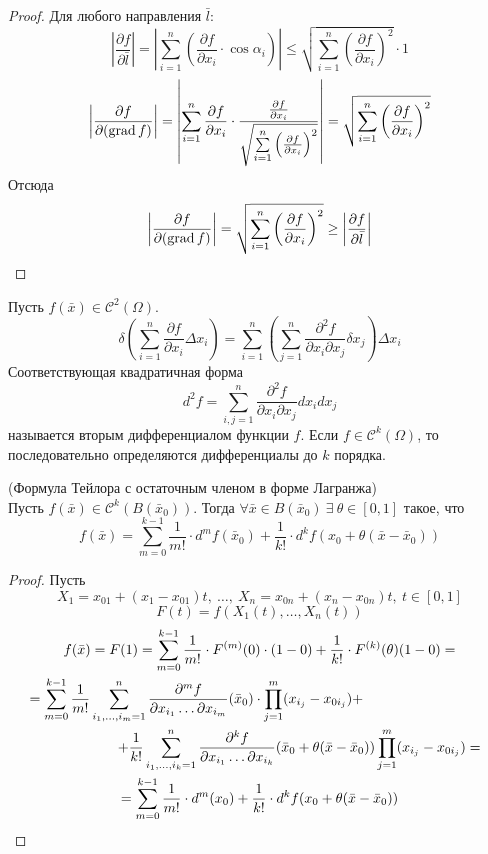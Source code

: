 \begin{proof}
    Для любого направления $\bar{l}$:
    \[\left|\frac{\partial {f}}{\partial {\bar{l}}}\right|=\left|\sum\limits_{i=1}^{n}\left(\frac{\partial {f}}{\partial {x_i}}\cdot \cos{\alpha_i}\right)\right|\leq \sqrt{\sum\limits_{i=1}^{n}\left(\frac{\partial {f}}{\partial {x_i}}\right)^2}\cdot 1\]
    \[\left|\frac{\partial {f}}{\partial {(\operatorname*{grad}{f})}}\right|=\left|\sum\limits_{i=1}^{n}\frac{\partial {f}}{\partial {x_i}}\cdot \frac{\frac{\partial {f}}{\partial {x_i}}}{\sqrt{\sum\limits_{i=1}^{n}\left(\frac{\partial {f}}{\partial {x_i}}\right)^2}}\right|=\sqrt{\sum\limits_{i=1}^{n}\left(\frac{\partial {f}}{\partial {x_i}}\right)^2}\]
    Отсюда
    \[\left|\frac{\partial {f}}{\partial {(\operatorname*{grad}{f})}}\right|=\sqrt{\sum\limits_{i=1}^{n}\left(\frac{\partial {f}}{\partial {x_i}}\right)^2}\geq \left|\frac{\partial {f}}{\partial {\bar{l}}}\right|\]

\end{proof} 
\begin{definition}
    Пусть $f(\bar{x})\in \mathcal{C}^2(\Omega)$.
    \[\delta(\sum\limits_{i=1}^{n}\frac{\partial {f}}{\partial {x_i}}\Delta x_i)=\sum\limits_{i=1}^{n}\left(\sum\limits_{j=1}^{n}\frac{\partial^2 {f}}{\partial {x_i}\partial{x_j}}\delta x_j\right)\Delta x_i\]
    Соответствующая квадратичная форма
    \[d^2f=\sum\limits_{i,j=1}^{n}\frac{\partial^2 {f}}{\partial {x_i}\partial{x_j}} d x_i dx_j\]
    называется вторым дифференциалом функции $f$. Если $f\in \mathcal{C}^k(\Omega)$, то последовательно определяются дифференциалы до $k$ порядка.
\end{definition} 
\begin{theorem} (Формула Тейлора с остаточным членом в форме Лагранжа)\\
    Пусть $f(\bar{x})\in \mathcal{C}^k(B(\bar{x}_0))$. Тогда $\forall \bar{x}\in B(\bar{x}_0)\ \exists\ \theta\in [0,1]$ такое, что
    \[f(\bar{x})=\sum\limits_{m=0}^{k-1}\frac{1}{m!}\cdot d^m f(\bar{x}_0)+\frac{1}{k!}\cdot d^k f(x_0+\theta(\bar{x}-\bar{x}_0))\] 
\end{theorem} 
\begin{proof}
    Пусть 
    \[X_1=x_{01}+(x_1-x_{01})t,\ \dots,\ X_n=x_{0n}+(x_n-x_{0n})t,\ t\in [0,1]\]
    \[F(t)=f(X_1(t),\dots, X_n(t))\]
    \begin{multline*}
        f(\bar{x})=F(1)=\sum\limits_{m=0}^{k-1}\frac{1}{m!}\cdot F^{(m)}(0)\cdot (1-0)+\frac{1}{k!}\cdot F^{(k)}(\theta)(1-0)=\\\
        =\sum\limits_{m=0}^{k-1}\frac{1}{m!}\sum\limits_{i_1,\dots,i_m=1}^{n}\frac{\partial^m {f}}{\partial {x_{i_1}} \dots \partial x_{i_m}}(\bar{x}_0)\cdot \prod\limits_{j=1}^{m}(x_{i_j}-x_{0i_j})+\tab[1.3cm]\tab[2cm]\\
        \tab[2cm]+\frac{1}{k!}\sum\limits_{i_1,\dots,i_k=1}^{n}\frac{\partial^k {f}}{\partial {x_{i_1}}\dots \partial x_{i_k}}(\bar{x}_0+\theta(\bar{x}-\bar{x}_0)) \prod\limits_{j=1}^{m}(x_{i_j}-x_{0i_j})=\\
        =\sum\limits_{m=0}^{k-1}\frac{1}{m!}\cdot d^m (x_0)+\frac{1}{k!}\cdot d^k f(x_0+\theta (\bar{x}-\bar{x}_0))
    \end{multline*}
\end{proof} 
